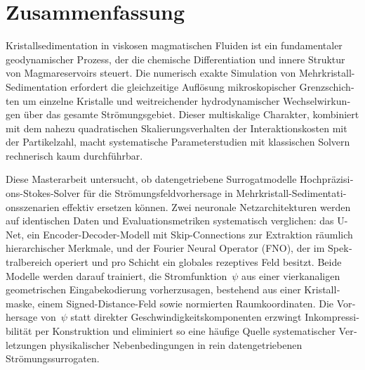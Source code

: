 \chapter*{Zusammenfassung}

\begin{otherlanguage}{ngerman}
Kristallsedimentation in viskosen magmatischen Fluiden ist ein fundamentaler
geodynamischer Prozess, der die chemische Differentiation und innere Struktur
von Magmareservoirs steuert. Die numerisch exakte Simulation von
Mehrkristall-Sedimentation erfordert die gleichzeitige Auflösung mikroskopischer
Grenzschichten um einzelne Kristalle und weitreichender hydrodynamischer
Wechselwirkungen über das gesamte Strömungsgebiet. Dieser multiskalige
Charakter, kombiniert mit dem nahezu quadratischen Skalierungsverhalten der
Interaktionskosten mit der Partikelzahl, macht systematische Parameterstudien
mit klassischen Solvern rechnerisch kaum durchführbar.

Diese Masterarbeit untersucht, ob datengetriebene Surrogatmodelle
Hochpräzisions-Stokes-Solver für die Strömungsfeldvorhersage in
Mehrkristall-Sedimentationsszenarien effektiv ersetzen können. Zwei neuronale
Netzarchitekturen werden auf identischen Daten und Evaluationsmetriken
systematisch verglichen: das U-Net, ein Encoder-Decoder-Modell mit
Skip-Connections zur Extraktion räumlich hierarchischer Merkmale, und der
Fourier Neural Operator (FNO), der im Spektralbereich operiert und pro Schicht
ein globales rezeptives Feld besitzt. Beide Modelle werden darauf trainiert, die
Stromfunktion~$\psi$ aus einer vierkanaligen geometrischen Eingabekodierung
vorherzusagen, bestehend aus einer Kristallmaske, einem Signed-Distance-Feld
sowie normierten Raumkoordinaten. Die
Vorhersage von~$\psi$ statt direkter Geschwindigkeitskomponenten erzwingt
Inkompressibilität per Konstruktion und eliminiert so eine häufige Quelle
systematischer Verletzungen physikalischer Nebenbedingungen in rein
datengetriebenen Strömungssurrogaten.


\end{otherlanguage}
